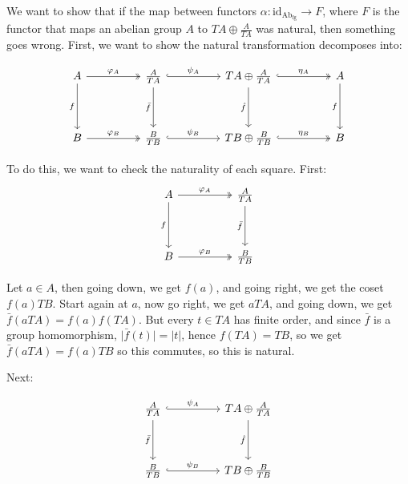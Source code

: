 \documentclass{article}
\begin{document}
\begin{customproof}
\

We want to show that if the map between functors $\alpha: \text{id}_{\text{Ab}_\text{fg}} \to F$, where $F$ is the functor that maps an abelian group $A$ to $TA \oplus \frac{A}{TA}$ was natural, then something goes wrong. First, we want to show the natural transformation decomposes into:

\[\begin{tikzcd}
	A && \frac{A}{TA} && TA \oplus \frac{A}{TA} && A \\
    \\
    B && \frac{B}{TB} && TB \oplus \frac{B}{TB} && B
    \arrow[two heads, from=1-1, to=1-3, "\varphi_A"]
    \arrow[hook, from=1-3, to=1-5, "\psi_A"]
    \arrow[hook, two heads, from=1-5, to=1-7, "\eta_A"]
    \arrow[two heads, from=3-1, to=3-3, "\varphi_B"]
    \arrow[hook, from=3-3, to=3-5, "\psi_B"]
    \arrow[hook, two heads, from=3-5, to=3-7, "\eta_B"]
    \arrow[from=1-1, to=3-1, "f"']
    \arrow[from=1-3, to=3-3, "\bar{f}"']
    \arrow[from=1-5, to=3-5, "\hat{f}"']
    \arrow[from=1-7, to=3-7, "f"']
\end{tikzcd}\]

To do this, we want to check the naturality of each square. First: 
\[\begin{tikzcd}
	A && \frac{A}{TA} \\
    \\
    B && \frac{B}{TB}
    \arrow[two heads, from=1-1, to=1-3, "\varphi_A"]
    \arrow[two heads, from=3-1, to=3-3, "\varphi_B"]
    \arrow[from=1-1, to=3-1, "f"']
    \arrow[from=1-3, to=3-3, "\bar{f}"']
\end{tikzcd}\]

Let $a \in A$, then going down, we get $f(a)$, and going right, we get the coset $f(a)TB$. Start again at $a$, now go right, we get $aTA$, and going down, we get $\bar{f}(aTA) = f(a)f(TA)$. But every $t \in TA$ has finite order, and since $\bar{f}$ is a group homomorphism, $\vert \bar{f}(t) \vert = \vert t \vert$, hence $f(TA) = TB$, so we get $\bar{f}(aTA) = f(a)TB$ so this commutes, so this is natural.

Next:

\[\begin{tikzcd}
	 \frac{A}{TA} && TA \oplus \frac{A}{TA} \\
    \\
    \frac{B}{TB} && TB \oplus \frac{B}{TB}
    \arrow[hook, from=1-1, to=1-3, "\psi_A"]
    \arrow[hook, from=3-1, to=3-3, "\psi_B"]
    \arrow[from=1-1, to=3-1, "\bar{f}"']
    \arrow[from=1-3, to=3-3, "\hat{f}"']
\end{tikzcd}\]


\end{customproof}
\end{document}
